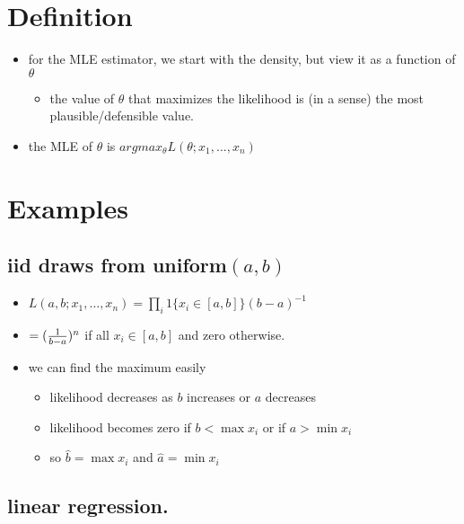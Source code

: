 \documentclass[11pt]{article}
\begin{document}
\section{Definition}
\label{sec-2}

\begin{itemize}
\item for the MLE estimator, we start with the density, but view it as a
     function of $\theta$
\begin{itemize}
\item the value of $\theta$ that maximizes the likelihood is (in a sense) the most plausible/defensible value.
\end{itemize}
\item the MLE of $\theta$ is $argmax_\theta L(\theta; x_1,\dots,x_n)$
\end{itemize}
\section{Examples}
\label{sec-3}
\subsection{iid draws from uniform$(a,b)$}
\label{sec-3-1}

\begin{itemize}
\item $L(a,b; x_1,\dots,x_n) = \prod_i 1\{x_i \in [a,b]\} (b-a)^{-1}$
\item $= ({1 \over b-a})^{n}$ if all $x_i \in [a,b]$ and zero otherwise.
\item we can find the maximum easily
\begin{itemize}
\item likelihood decreases as $b$ increases or $a$ decreases
\item likelihood becomes zero if $b < \max x_i$ or if $a > \min x_i$
\item so $\hat b = \max x_i$ and $\hat a = \min x_i$
\end{itemize}
\end{itemize}
\subsection{linear regression.}
\label{sec-3-2}
\end{document}
